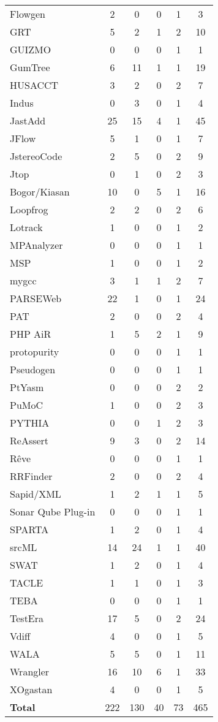 \begin{longtable}{ l c c c c c }
   Flowgen & 2 & 0 & 0 & 1 & 3 \\
   GRT & 5 & 2 & 1 & 2 & 10 \\
   GUIZMO & 0 & 0 & 0 & 1 & 1 \\
   GumTree & 6 & 11 & 1 & 1 & 19 \\
   HUSACCT & 3 & 2 & 0 & 2 & 7 \\
   Indus & 0 & 3 & 0 & 1 & 4 \\
   JastAdd & 25 & 15 & 4 & 1 & 45 \\
   JFlow & 5 & 1 & 0 & 1 & 7 \\
   JstereoCode & 2 & 5 & 0 & 2 & 9 \\
   Jtop & 0 & 1 & 0 & 2 & 3 \\
   Bogor/Kiasan & 10 & 0 & 5 & 1 & 16 \\
   Loopfrog & 2 & 2 & 0 & 2 & 6 \\
   Lotrack & 1 & 0 & 0 & 1 & 2 \\
   MPAnalyzer & 0 & 0 & 0 & 1 & 1 \\
   MSP & 1 & 0 & 0 & 1 & 2 \\
   mygcc & 3 & 1 & 1 & 2 & 7 \\
   PARSEWeb & 22 & 1 & 0 & 1 & 24 \\
   PAT & 2 & 0 & 0 & 2 & 4 \\
   PHP AiR & 1 & 5 & 2 & 1 & 9 \\
   protopurity & 0 & 0 & 0 & 1 & 1 \\
   Pseudogen & 0 & 0 & 0 & 1 & 1 \\
   PtYasm & 0 & 0 & 0 & 2 & 2 \\
   PuMoC & 1 & 0 & 0 & 2 & 3 \\
   PYTHIA & 0 & 0 & 1 & 2 & 3 \\
   ReAssert & 9 & 3 & 0 & 2 & 14 \\
   Rêve & 0 & 0 & 0 & 1 & 1 \\
   RRFinder & 2 & 0 & 0 & 2 & 4 \\
   Sapid/XML & 1 & 2 & 1 & 1 & 5 \\
   Sonar Qube Plug-in & 0 & 0 & 0 & 1 & 1 \\
   SPARTA & 1 & 2 & 0 & 1 & 4 \\
   srcML & 14 & 24 & 1 & 1 & 40 \\
   SWAT & 1 & 2 & 0 & 1 & 4 \\
   TACLE & 1 & 1 & 0 & 1 & 3 \\
   TEBA & 0 & 0 & 0 & 1 & 1 \\
   TestEra & 17 & 5 & 0 & 2 & 24 \\
   Vdiff & 4 & 0 & 0 & 1 & 5 \\
   WALA & 5 & 5 & 0 & 1 & 11 \\
   Wrangler & 16 & 10 & 6 & 1 & 33 \\
   XOgastan & 4 & 0 & 0 & 1 & 5 \\
  \hline
  {\bf Total} & 222 & 130 & 40 & 73 & 465 \\
\end{longtable}

